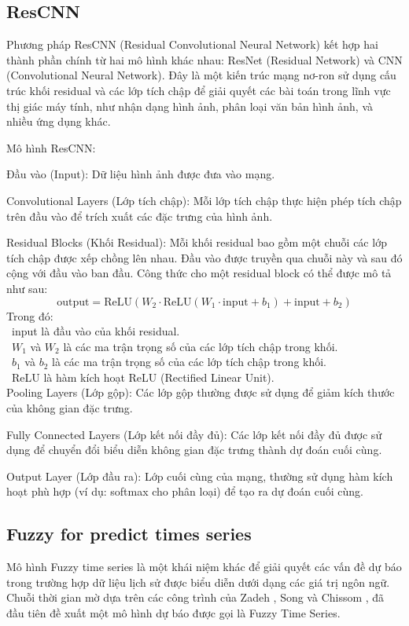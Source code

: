 \documentclass[conference]{IEEEtran}
\begin{document}
\subsection{ResCNN}
Phương pháp ResCNN (Residual Convolutional Neural Network) kết hợp hai thành phần chính từ hai mô hình khác nhau: ResNet (Residual Network) và CNN (Convolutional Neural Network). Đây là một kiến trúc mạng nơ-ron sử dụng cấu trúc khối residual và các lớp tích chập để giải quyết các bài toán trong lĩnh vực thị giác máy tính, như nhận dạng hình ảnh, phân loại văn bản hình ảnh, và nhiều ứng dụng khác.

Mô hình ResCNN:

Đầu vào (Input): Dữ liệu hình ảnh được đưa vào mạng.

Convolutional Layers (Lớp tích chập): Mỗi lớp tích chập thực hiện phép tích chập trên đầu vào để trích xuất các đặc trưng của hình ảnh.

Residual Blocks (Khối Residual): Mỗi khối residual bao gồm một chuỗi các lớp tích chập được xếp chồng lên nhau. Đầu vào được truyền qua chuỗi này và sau đó cộng với đầu vào ban đầu. 
Công thức cho một residual block có thể được mô tả như sau: 
\[
\text{output} = \text{ReLU}(W_2 \cdot \text{ReLU}(W_1 \cdot \text{input} + b_1) + \text{input} + b_2)
\]
Trong đó:\\
        \indent\textbullet\ input là đầu vào của khối residual. \\
	\indent\textbullet\ $W_1$ và $W_2$ là các ma trận trọng số của các lớp tích chập trong khối. \\
 	\indent\textbullet\ $b_1$ và $b_2$ là các ma trận trọng số của các lớp tích chập trong khối. \\
 	\indent\textbullet\ ReLU là hàm kích hoạt ReLU (Rectified Linear Unit). \\

Pooling Layers (Lớp gộp): Các lớp gộp thường được sử dụng để giảm kích thước của không gian đặc trưng.

Fully Connected Layers (Lớp kết nối đầy đủ): Các lớp kết nối đầy đủ được sử dụng để chuyển đổi biểu diễn không gian đặc trưng thành dự đoán cuối cùng.

Output Layer (Lớp đầu ra): Lớp cuối cùng của mạng, thường sử dụng hàm kích hoạt phù hợp (ví dụ: softmax cho phân loại) để tạo ra dự đoán cuối cùng.
\subsection{Fuzzy for predict times series}
Mô hình Fuzzy time series là một khái niệm khác để giải quyết các vấn đề dự báo trong trường hợp dữ liệu lịch sử được biểu diễn dưới dạng các giá trị ngôn ngữ. Chuỗi thời gian mờ dựa trên các công trình của Zadeh , Song và Chissom , đã đầu tiên đề xuất một mô hình dự báo được gọi là Fuzzy Time Series.
\end{document}

